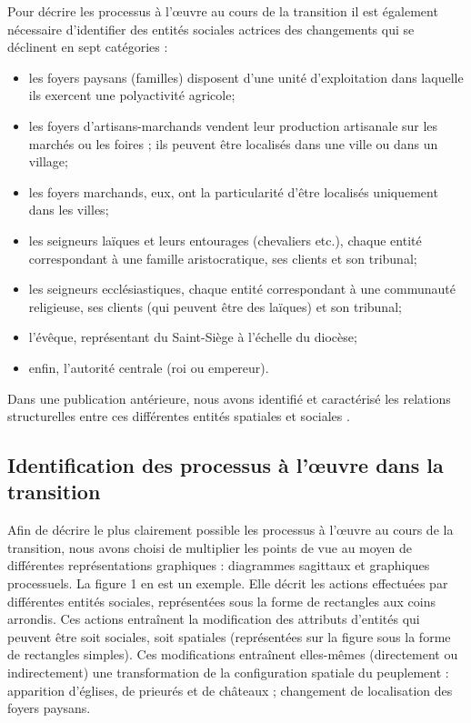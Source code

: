 Pour décrire les processus à l'œuvre au cours de la transition il est également nécessaire d'identifier des entités sociales actrices des changements qui
se déclinent en sept catégories :
\begin{itemize}
	\item les foyers paysans (familles) disposent d'une unité d'exploitation dans	laquelle ils exercent une polyactivité agricole;
	
	\item les foyers d'artisans-marchands vendent leur production artisanale sur les marchés ou les foires ; ils peuvent être localisés dans une ville ou dans un village;
	
	\item les foyers marchands, eux, ont la particularité d'être localisés uniquement dans les villes;
	
	\item les seigneurs laïques et leurs entourages (chevaliers etc.), chaque entité correspondant à une famille aristocratique, ses clients et son tribunal;
	
	\item les seigneurs ecclésiastiques, chaque entité correspondant à une communauté religieuse, ses clients (qui peuvent être des laïques) et son tribunal;		
	
	\item l'évêque, représentant du Saint-Siège à l'échelle du diocèse;
	
	\item enfin, l'autorité centrale (roi ou empereur).
\end{itemize}

Dans une publication antérieure, nous avons identifié et caractérisé les relations structurelles entre ces différentes entités spatiales et sociales \autocite[figure 13.1, p. 295]{tannier_ontologie_2014}.

\subsection{Identification des processus à l'œuvre dans la transition}

Afin de décrire le plus clairement possible les processus à l'œuvre au cours de la transition, nous avons choisi de multiplier les points de vue au moyen de	différentes représentations graphiques : diagrammes sagittaux et graphiques	processuels.
La figure 1 en est un exemple.
Elle décrit les actions effectuées par différentes entités sociales, représentées sous la forme de rectangles aux coins arrondis.
Ces actions entraînent la modification des attributs d'entités qui peuvent être soit sociales, soit spatiales (représentées sur la figure sous la forme de rectangles simples).
Ces modifications entraînent elles-mêmes (directement ou indirectement) une transformation de la configuration spatiale du peuplement : apparition d'églises, de prieurés et de châteaux ; changement de localisation des foyers paysans.

